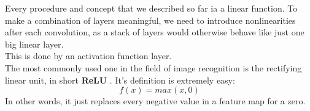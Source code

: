 Every procedure and concept that we described so far ia a linear function.  
To make a combination of layers meaningful, we need to introduce nonlinearities after each convolution, as a stack of layers would otherwise behave like just one big linear layer.\\
This is done by an activation function layer. \\
The most commonly used one in the field of image recognition is the rectifying linear unit, in short \textbf{ReLU} \cite{AlexKrizhevsky2012}.
It's definition is extremely easy:
$$f(x) = max(x, 0)$$
In other words, it just replaces every negative value in a feature map for a zero.  
